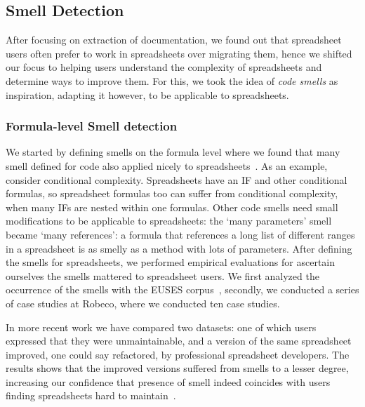 \documentclass[conference]{IEEEtran}
\begin{document}
\subsection{Smell Detection} 
After focusing on extraction of documentation, we found out that spreadsheet users often prefer to work in spreadsheets over migrating them, hence we shifted our focus to helping users understand the complexity of spreadsheets and determine ways to improve them. For this, we took the idea of \emph{code smells} as inspiration, adapting it however, to be applicable to spreadsheets. 

\subsubsection{Formula-level Smell detection}
We started by defining smells on the formula level where we found that many smell defined for code also applied nicely to spreadsheets~\cite{hermans_detecting_2014}. As an example, consider conditional complexity. Spreadsheets have an IF and other conditional formulas, so spreadsheet formulas too can suffer from conditional complexity, when many IFs are nested within one formulas. Other code smells need small modifications to be applicable to spreadsheets: the `many parameters' smell became `many references': a formula that references a long list of different ranges in a spreadsheet is as smelly as a method with lots of parameters. After defining the smells for spreadsheets, we performed empirical evaluations for ascertain ourselves the smells mattered to spreadsheet users. We first analyzed the occurrence of the smells with the EUSES corpus~\cite{fisher_euses_2005}, secondly, we conducted a series of case studies at Robeco, where we conducted ten case studies. 

In more recent work we have compared two datasets: one of which users expressed that they were unmaintainable, and a version of the same spreadsheet improved, one could say refactored, by professional spreadsheet developers. The results shows that the improved versions suffered from smells to a lesser degree, increasing our confidence that presence of smell indeed coincides with users finding spreadsheets hard to maintain~\cite{Jansen2015}.
\end{document}
